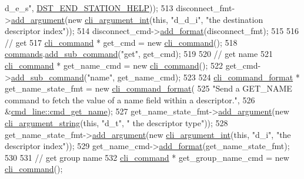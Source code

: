 \begin{DoxyCode}
{      d\_e\_s"}, \hyperlink{cmd__line_8cpp_a98040c43d21908ec69faa420184085bd}{DST\_END\_STATION\_HELP}));
513     disconnect\_fmt->\hyperlink{classcli__command__format_ac3fc6d13a227c195d5ee6f7b78eba9cd}{add\_argument}(\textcolor{keyword}{new} \hyperlink{classcli__argument__int}{cli\_argument\_int}(\textcolor{keyword}{this}, \textcolor{stringliteral}{"d\_d\_i"}, \textcolor{stringliteral}{"the
       destination descriptor index"}));
514     disconnect\_cmd->\hyperlink{classcli__command_aa9ec38e761644d946f8db2b920e39921}{add\_format}(disconnect\_fmt);
515 
516     \textcolor{comment}{// get}
517     \hyperlink{classcli__command}{cli\_command} * get\_cmd = \textcolor{keyword}{new} \hyperlink{classcli__command}{cli\_command}();
518     \hyperlink{classcmd__line_ae4fea670c2fdd2b60f7b5b6ad6fbaf1e}{commands}.\hyperlink{classcli__command_aa73a67e8ebb6facd4b40ced66279b226}{add\_sub\_command}(\textcolor{stringliteral}{"get"}, get\_cmd);
519 
520     \textcolor{comment}{// get name}
521     \hyperlink{classcli__command}{cli\_command} * get\_name\_cmd = \textcolor{keyword}{new} \hyperlink{classcli__command}{cli\_command}();
522     get\_cmd->\hyperlink{classcli__command_aa73a67e8ebb6facd4b40ced66279b226}{add\_sub\_command}(\textcolor{stringliteral}{"name"}, get\_name\_cmd);
523 
524     \hyperlink{classcli__command__format}{cli\_command\_format} * get\_name\_state\_fmt = \textcolor{keyword}{new} 
      \hyperlink{classcli__command__format}{cli\_command\_format}(
525         \textcolor{stringliteral}{"Send a GET\_NAME command to fetch the value of a name field within a descriptor."},
526         &\hyperlink{classcmd__line_a33941d08707eaa3e1eb57910a2e67de3}{cmd\_line::cmd\_get\_name});
527     get\_name\_state\_fmt->\hyperlink{classcli__command__format_ac3fc6d13a227c195d5ee6f7b78eba9cd}{add\_argument}(\textcolor{keyword}{new} \hyperlink{classcli__argument__string}{cli\_argument\_string}(\textcolor{keyword}{this}, \textcolor{stringliteral}{"d\_t"}, \textcolor{stringliteral}{"
      the descriptor type"}));
528     get\_name\_state\_fmt->\hyperlink{classcli__command__format_ac3fc6d13a227c195d5ee6f7b78eba9cd}{add\_argument}(\textcolor{keyword}{new} \hyperlink{classcli__argument__int}{cli\_argument\_int}(\textcolor{keyword}{this}, \textcolor{stringliteral}{"d\_i"}, \textcolor{stringliteral}{"the
       descriptor index"}));
529     get\_name\_cmd->\hyperlink{classcli__command_aa9ec38e761644d946f8db2b920e39921}{add\_format}(get\_name\_state\_fmt);
530 
531     \textcolor{comment}{// get group name}
532     \hyperlink{classcli__command}{cli\_command} * get\_group\_name\_cmd = \textcolor{keyword}{new} \hyperlink{classcli__command}{cli\_command}();

\end{DoxyCode}

